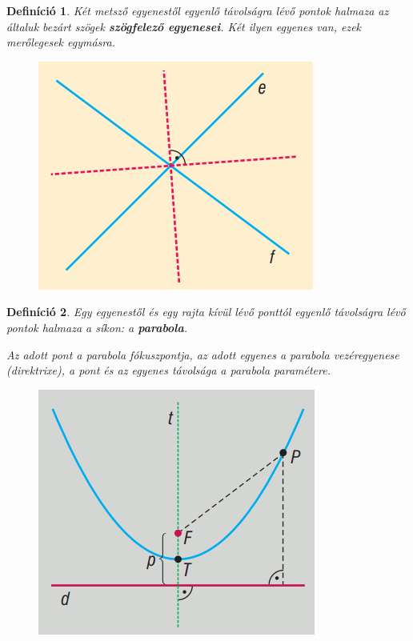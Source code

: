 \documentclass[12pt,a4paper]{article}
\newtheorem{definition}{Definíció} [section]
\begin{document}
\begin{definition}
Két metsző egyenestől egyenlő távolságra lévő pontok halmaza az általuk bezárt szögek \textbf{szögfelező egyenesei}. Két ilyen egyenes van, ezek merőlegesek egymásra.
\begin{figure}[h]
\centering
\includegraphics[scale=0.35]{img/szogfelezo_egyenes}
\end{figure}
\end{definition}

\begin{definition}
Egy egyenestől és egy rajta kívül lévő ponttól egyenlő távolságra lévő pontok halmaza a síkon: a \textbf{parabola}.

Az adott pont a parabola fókuszpontja, az adott egyenes a parabola vezéregyenese (direktrixe), a pont és az egyenes távolsága a parabola paramétere.
\begin{figure}[h]
\centering
\includegraphics[scale=0.35]{img/parabola}
\end{figure}
\end{definition}
\end{document}
